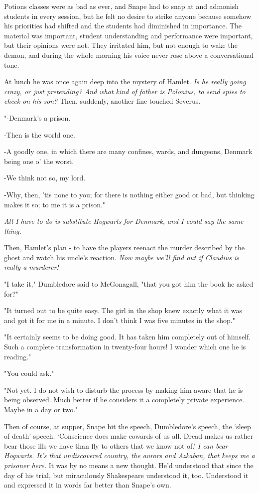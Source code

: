 Potions classes were as bad as ever, and Snape had to snap at and admonish students in every session, but he felt no desire to strike anyone because somehow his priorities had shifted and the students had diminished in importance. The material was important, student understanding and performance were important, but their opinions were not. They irritated him, but not enough to wake the demon, and during the whole morning his voice never rose above a conversational tone.

At lunch he was once again deep into the mystery of Hamlet. \emph{Is he really going crazy, or just pretending? And what kind of father is Polonius, to send spies to check on his son?} Then, suddenly, another line touched Severus.

"-Denmark's a prison.

-Then is the world one.

-A goodly one, in which there are many confines, wards, and dungeons, Denmark being one o' the worst.

-We think not so, my lord.

-Why, then, 'tis none to you; for there is nothing either good or bad, but thinking makes it so; to me it is a prison."

\emph{All I have to do is substitute Hogwarts for Denmark, and I could say the same thing.}

Then, Hamlet's plan - to have the players reenact the murder described by the ghost and watch his uncle's reaction. \emph{Now maybe we'll find out if Claudius is really a murderer!}

"I take it," Dumbledore said to McGonagall, "that you got him the book he asked for?"

"It turned out to be quite easy. The girl in the shop knew exactly what it was and got it for me in a minute. I don't think I was five minutes in the shop."

"It certainly seems to be doing good. It has taken him completely out of himself. Such a complete transformation in twenty-four hours! I wonder which one he is reading."

"You could ask."

"Not yet. I do not wish to disturb the process by making him aware that he is being observed. Much better if he considers it a completely private experience. Maybe in a day or two."

Then of course, at supper, Snape hit the speech, Dumbledore's speech, the `sleep of death' speech. `Conscience does make cowards of us all. Dread makes us rather bear those ills we have than fly to others that we know not of.' \emph{I can bear Hogwarts. It's that undiscovered country, the aurors and Azkaban, that keeps me a prisoner here.} It was by no means a new thought. He'd understood that since the day of his trial, but miraculously Shakespeare understood it, too. Understood it and expressed it in words far better than Snape's own.


